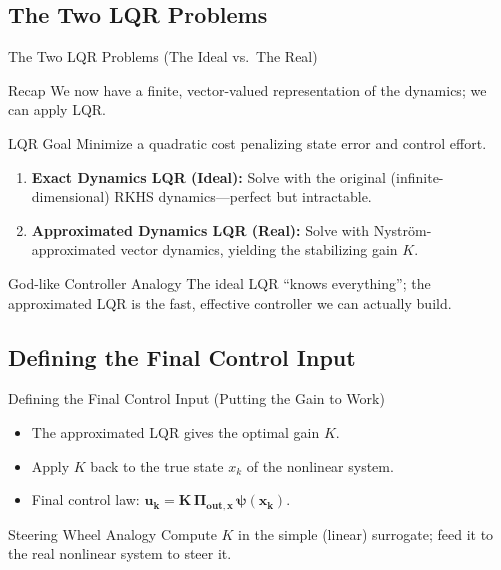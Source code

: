 \documentclass{beamer}
\begin{document}
\subsection{The Two LQR Problems}
\begin{frame}[allowframebreaks]{The Two LQR Problems (The Ideal vs.\ The Real)}
\begin{block}{Recap}
We now have a finite, vector-valued representation of the dynamics; we can apply LQR.
\end{block}
\begin{block}{LQR Goal}
Minimize a quadratic cost penalizing state error and control effort.
\end{block}

\begin{enumerate}
  \item \textbf{Exact Dynamics LQR (Ideal):} Solve with the original (infinite-dimensional) RKHS dynamics—perfect but intractable.
  \item \textbf{Approximated Dynamics LQR (Real):} Solve with Nyström-approximated vector dynamics, yielding the stabilizing gain $K$.
\end{enumerate}

\framebreak

\begin{block}{God-like Controller Analogy}
The ideal LQR ``knows everything''; the approximated LQR is the fast, effective controller we can actually build.
\end{block}
\end{frame}

\subsection{Defining the Final Control Input}
\begin{frame}{Defining the Final Control Input (Putting the Gain to Work)}
\begin{itemize}
  \item The approximated LQR gives the optimal gain $K$.
  \item Apply $K$ back to the true state $x_k$ of the nonlinear system.
  \item Final control law: $\mathbf{u_k = K\,\Pi_{\text{out},x}\,\psi(x_k)}$.
\end{itemize}
\begin{block}{Steering Wheel Analogy}
Compute $K$ in the simple (linear) surrogate; feed it to the real nonlinear system to steer it.
\end{block}
\end{frame}
\end{document}

